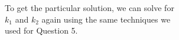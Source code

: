 \documentclass[preview]{standalone}
\begin{document}
\begin{center}
\raggedright
                        To get the particular solution, we can solve for \\
                        $k_1$ and $k_2$ again using the same techniques we \\
                        used for Question 5.
\end{center}
\end{document}
